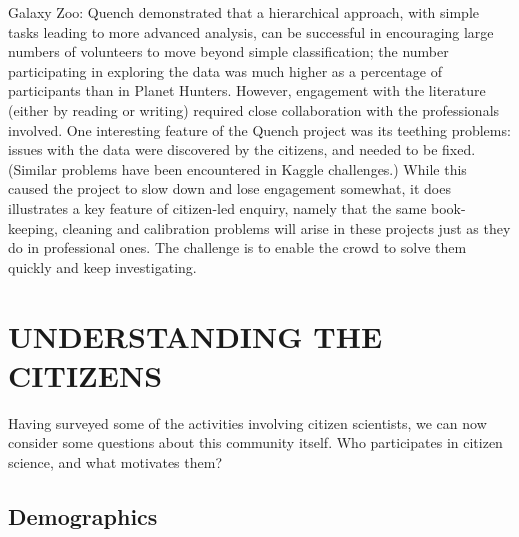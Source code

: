 \documentclass{ar2e}
\begin{document}
Galaxy Zoo: Quench demonstrated that a hierarchical approach, with simple tasks
leading to more advanced analysis, can be successful in encouraging large
numbers of volunteers to move beyond simple classification; the number
participating in exploring the data was much higher as a percentage of
participants than in Planet Hunters. However, engagement with the literature
(either by reading or writing) required close collaboration with the
professionals involved. One interesting feature of the Quench project was its
teething problems: issues with the data were discovered by the citizens, and
needed to be fixed. (Similar problems have been encountered in Kaggle
challenges.) While this caused the project to slow down and lose engagement
somewhat, it does illustrates a key feature of citizen-led enquiry, namely that the
same book-keeping, cleaning and calibration problems will arise in these
projects just as they do in professional ones. The challenge is to enable the
crowd to solve them quickly and keep investigating.



\section{UNDERSTANDING THE CITIZENS}
\label{sec:crowd}

Having surveyed some of the activities involving citizen scientists, we can
now consider some questions about this community itself. Who participates in
citizen science, and what motivates them?



\subsection{Demographics}
\label{sec:crowd:demographics}
\end{document}
